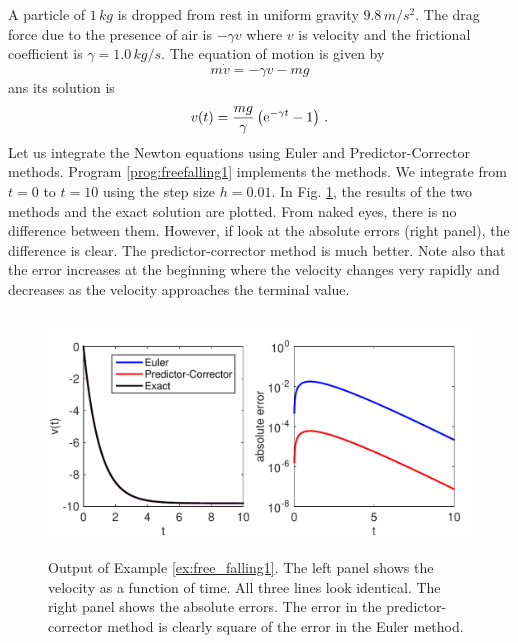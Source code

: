 \bigskip
\begin{example} \label{ex:free_falling1}

\medskip
A particle of $1\, kg$ is dropped from rest in uniform gravity $9.8\, m/s^2$.  The drag force due to the presence of air is $-\gamma v$ where $v$ is velocity and the frictional coefficient is $\gamma=1.0\, kg/s$. The equation of motion is given by
\begin{equation}
m \dot{v} = - \gamma v - m g
\end{equation}
ans its solution is 
\begin{equation}
v(t) = \frac{m g}{\gamma} \left ( \text{e}^{-\gamma t} -1 \right )\,.
\end{equation}
Let us integrate the Newton equations using Euler and Predictor-Corrector methods. Program \ref{prog:freefalling1} implements the methods.  We integrate from $t=0$ to $t=10$ using the step size $h=0.01$.  In Fig. \ref{fig:free_falling1}, the results of the two methods and the exact solution are plotted.  From naked eyes, there is no difference between them.  However, if look at the absolute errors (right panel), the difference is clear. The predictor-corrector method is much better.  Note also that the error increases at the beginning where the velocity changes very rapidly and decreases as the velocity approaches the terminal value.

\begin{figure}
\centerline{\includegraphics[height=2.5in]{05.ode1/free_falling1.pdf}}
\caption{Output of Example \ref{ex:free_falling1}.  The left panel shows the velocity as a function of time.  All three lines look identical. The right panel shows the absolute errors. The error in the predictor-corrector method is clearly  square of the error in the Euler method.}
\label{fig:free_falling1}
\end{figure}
\end{example}

